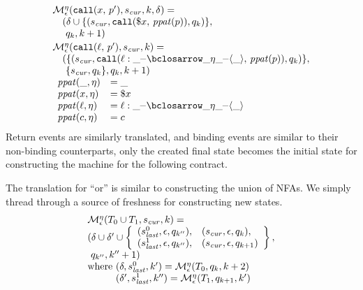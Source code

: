 \begin{align*}
\begin{array}{l}
  \epshelp^\mtimeline(\scallev{\mvar}{\mvpat'}, \pmsmqcur, k, \delta) = \\
\quad           (\delta
            \cup \setof{(\pmsmqcur,
                         \apvcall{\sref{\mvar}}{\vpatToPattern(\mvpat)},
                         \pmsmq_k)}, \\
\quad            \ \pmsmq_k, k+1)
\\[2pt]
%
  \epshelp^\mtimeline(\scallev{\mtoplevelname}{\mvpat'}, \pmsmqcur, k) = \\
\quad           (\setof{(\pmsmqcur,
                         \apvcall{\bclos{\mtoplevelname}{\swc}{\swc}{\swc}{\mtimeline}{\swc}{\swc}{\swc}}{\vpatToPattern(\mvpat)},
                         \pmsmq_k)}, \\
\quad            \ \setof{\pmsmqcur, \pmsmq_k}, \pmsmq_k, k+1)
\\
\begin{array}{ll}
  \vpatToPattern(\swc, \mtimeline) &= \swc
\\
  \vpatToPattern(\mvar, \mtimeline) &= \sref{\mvar}
\\
  \vpatToPattern(\mtoplevelname, \mtimeline) &= \bclos{\mtoplevelname}{\swc}{\swc}{\swc}{\mtimeline}{\swc}{\swc}{\swc} \\
  \vpatToPattern(\mconstant, \mtimeline) &= \mconstant
\end{array}
\end{array}
\end{align*}
Return events are similarly translated, and binding events are similar to their non-binding counterparts, only the created final state becomes the initial state for constructing the machine for the following contract.

The translation for ``or'' is similar to constructing the union of NFAs.
%
We simply thread through a source of freshness for constructing new states.
%
\begin{align*}
  \begin{array}{l}
  \epshelp^\mtimeline(\stOr{\mtcon_0}{\mtcon_1}, \pmsmqcur, k) = \\
    (\delta\cup \delta' \cup
    \left\{\begin{array}{ll}
        (\pmsmqlast^0, \epsilon, \pmsmq_{k''}),&
        (\pmsmqcur, \epsilon, \pmsmq_k),\\
        (\pmsmqlast^1, \epsilon, \pmsmq_{k''}),&
        (\pmsmqcur, \epsilon, \pmsmq_{k+1})
      \end{array}\right\},
    \\
    \ \pmsmq_{k''}, k''+ 1)
    \\
    \text{where } (\delta, \pmsmqlast^0, k') = \epshelp^\mtimeline(\mtcon_0, \pmsmq_k, k+2) \\
    \phantom{\text{where }} (\delta', \pmsmqlast^1, k'') = \epshelp^\mtimeline(\mtcon_1, \pmsmq_{k+1}, k')
  \end{array}
\end{align*}

